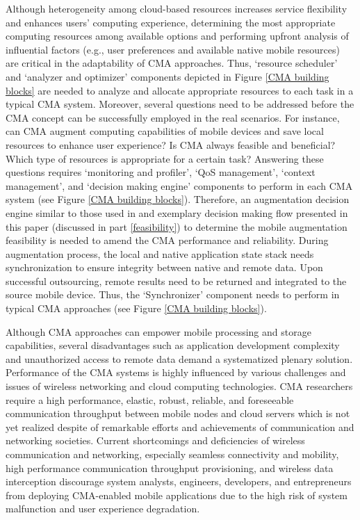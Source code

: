 \documentclass[publish]{IEEEtran}
\begin{document}
Although heterogeneity among cloud-based resources increases service flexibility and enhances users' computing experience, determining the most appropriate computing resources among available options and performing upfront analysis of influential factors (e.g., user preferences and available native mobile resources) are critical in the adaptability of CMA approaches. Thus, `resource scheduler' and `analyzer and optimizer' components depicted in Figure \ref{CMA building blocks} are needed to analyze and allocate appropriate resources to each task in a typical CMA system. Moreover, several questions need to be addressed before the CMA concept can be successfully employed in the real scenarios. For instance, can CMA augment computing capabilities of mobile devices and save local resources to enhance user experience? Is CMA always feasible and beneficial? Which type of resources is appropriate for a certain task? Answering these questions requires `monitoring and profiler', `QoS management', `context management', and `decision making engine' components  to perform in each CMA system (see Figure \ref{CMA building blocks}). Therefore, an augmentation decision engine similar to those used in \cite{cuervo2010maui,Zhang2011,Giurgiu2009} and exemplary decision making flow presented in this paper (discussed in part \ref{feasibility}) to determine the mobile augmentation feasibility is needed to amend the CMA performance and reliability. During augmentation process, the local and native application state stack needs synchronization to ensure integrity between native and remote data. Upon successful outsourcing, remote results need to be returned and integrated to the source mobile device. Thus, the `Synchronizer'  component needs to perform in typical CMA approaches (see Figure \ref{CMA building blocks}).

Although CMA approaches can empower mobile processing and storage capabilities, several disadvantages such as application development complexity and unauthorized access to remote data demand a systematized plenary solution. Performance of the CMA systems is highly influenced by various challenges and issues of wireless networking and cloud computing technologies. CMA researchers require a high performance, elastic, robust, reliable, and foreseeable communication throughput between mobile nodes and cloud servers which is not yet realized despite of remarkable efforts and achievements of communication and networking societies. Current shortcomings and deficiencies of wireless communication and networking, especially seamless connectivity and mobility, high performance communication throughput provisioning, and wireless data interception discourage system analysts, engineers, developers, and entrepreneurs from deploying CMA-enabled mobile applications due to the high risk of system malfunction and user experience degradation.
\end{document}
